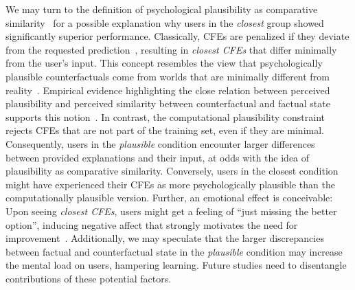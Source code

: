 We may turn to the definition of psychological plausibility as comparative similarity~\citep{lewis_counterfactuals_1973, stanley_counterfactual_2017} for a possible explanation why users in the \textit{closest} group showed significantly superior performance. 
Classically, \glspl{CFE} are penalized if they deviate from the requested prediction~\citep{wachter_counterfactual_2017}, resulting in \textit{closest \glspl{CFE}} that differ minimally from the user's input.
This concept resembles the view that psychologically plausible counterfactuals come from worlds that are minimally different from reality~\citep{lewis_counterfactuals_1973}.
Empirical evidence highlighting the close relation between perceived plausibility and perceived similarity between counterfactual and factual state supports this notion~\citep{stanley_counterfactual_2017, de_brigard_perceived_2021}.
In contrast, the computational plausibility constraint rejects \glspl{CFE} that are not part of the training set, even if they are minimal.
Consequently, users in the \textit{plausible} condition encounter larger differences between provided explanations and their input, at odds with the idea of plausibility as comparative similarity.
Conversely, users in the closest condition might have experienced their \glspl{CFE} as more psychologically plausible than the computationally plausible version.
Further, an emotional effect is conceivable: Upon seeing \textit{closest \glspl{CFE}}, users might get a feeling of ``just missing the better option'', inducing negative affect that strongly motivates the need for improvement~\citep{medvec_when_1997, markman_reflection_2003}.
Additionally, we may speculate that the larger discrepancies between factual and counterfactual state in the \textit{plausible} condition may increase the mental load on users, hampering learning.
Future studies need to disentangle contributions of these potential factors.

